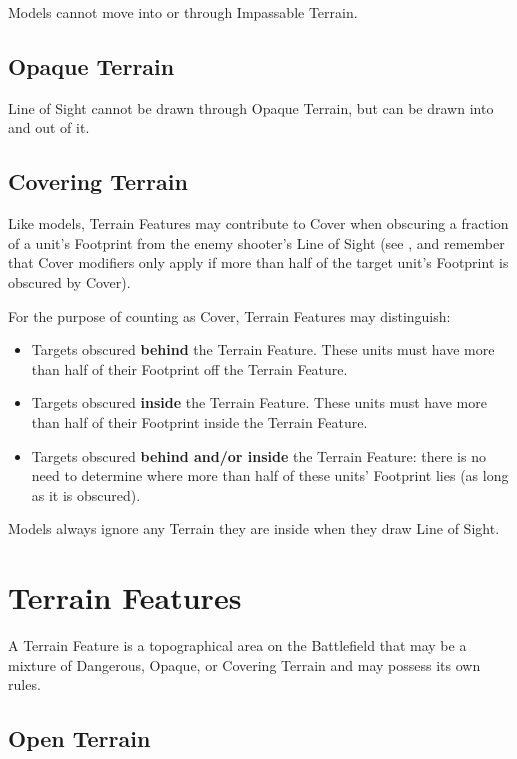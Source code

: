 Models cannot move into or through Impassable Terrain. 

\subsection{Opaque Terrain}
\label{opaque_terrain}

Line of Sight cannot be drawn through Opaque Terrain, but can be drawn into and out of it.

\subsection{Covering Terrain}
\label{covering_terrain}

Like models, Terrain Features may contribute to Cover when obscuring a fraction of a unit's Footprint from the enemy shooter's Line of Sight (see , and remember that Cover modifiers only apply if more than half of the target unit's Footprint is obscured by Cover).

For the purpose of counting as Cover, Terrain Features may distinguish:

\begin{itemize}[label={-}]
\item Targets obscured \textbf{behind} the Terrain Feature. These units must have more than half of their Footprint off the Terrain Feature.
\item Targets obscured \textbf{inside} the Terrain Feature. These units must have more than half of their Footprint inside the Terrain Feature.
\item Targets obscured \textbf{behind and/or inside} the Terrain Feature: there is no need to determine where more than half of these units' Footprint lies (as long as it is obscured).
\end{itemize}

Models always ignore any Terrain they are inside when they draw Line of Sight.

\newpage
\section{Terrain Features}
\label{terrain_features}

A Terrain Feature is a topographical area on the Battlefield that may be a mixture of Dangerous, Opaque, or Covering Terrain and may possess its own rules.

\subsection{Open Terrain}
\label{open_terrain}

